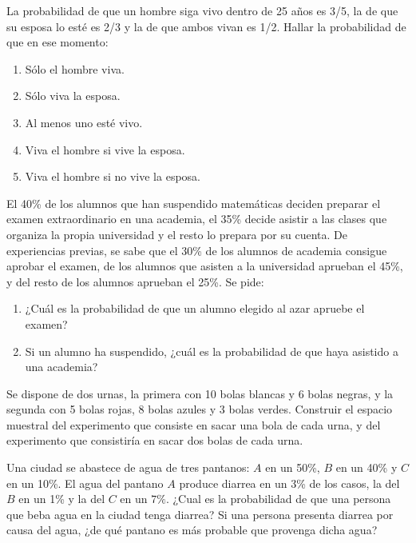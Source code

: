 {La probabilidad de que un hombre siga vivo dentro de 25 años es 3/5, la de que su esposa lo esté es 2/3 y la de que
ambos vivan es 1/2. Hallar la probabilidad de que en ese momento:
\begin{enumerate}
\item Sólo el hombre viva.
\item Sólo viva la esposa.
\item Al menos uno esté vivo.
\item Viva el hombre si vive la esposa.
\item Viva el hombre si no vive la esposa.
\end{enumerate}
}
{}
{}


{El 40\% de los alumnos que han suspendido matemáticas deciden preparar el examen extraordinario en una academia, el
35\% decide asistir a las clases que organiza la propia universidad y el resto lo prepara por su cuenta.
De experiencias previas, se sabe que el 30\% de los alumnos de academia consigue aprobar el examen, de los alumnos que
asisten a la universidad aprueban el 45\%, y del resto de los alumnos aprueban el 25\%.
Se pide:
\begin{enumerate}
\item ¿Cuál es la probabilidad de que un alumno elegido al azar apruebe el examen?
\item Si un alumno ha suspendido, ¿cuál es la probabilidad de que haya asistido a una academia?
\end{enumerate}
}
{}
{}


{Se dispone de dos urnas, la primera con 10 bolas blancas y 6 bolas negras, y la segunda con 5 bolas rojas, 8 bolas
azules y 3 bolas verdes.
Construir el espacio muestral del experimento que consiste en sacar una bola de cada urna, y
del experimento que consistiría en sacar dos bolas de cada urna.}
{}
{}


{Una ciudad se abastece de agua de tres pantanos: $A$ en un 50\%, $B$ en un 40\% y $C$ en un 10\%. El agua del pantano $A$ produce diarrea en un 3\% de los casos, la del $B$ en un 1\% y la del $C$ en un $7\%$. ¿Cual es la probabilidad de que una persona que beba agua en la ciudad tenga diarrea? Si una persona presenta diarrea por causa del agua, ¿de qué pantano es más probable que provenga dicha agua?
}
{}
{}

